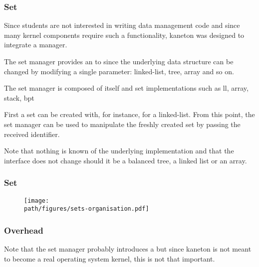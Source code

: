 \begin{frame}
  \frametitle{Set}

  Since students are not interested in writing data management code and
  since many kernel components require such a functionality, kaneton was
  designed to integrate a  manager.

  \-

  The set manager provides an  to
   since the underlying data structure can be changed by
  modifying a single parameter: linked-list, tree, array and so on.

  \-

  The set manager is composed of itself and set implementations such as ll,
  array, stack, bpt \etc{}

  \-

  First a set can be created with, for instance,
   for a linked-list. From
  this point, the set manager can be used to manipulate the freshly created
  set by passing the received identifier.

  \-

  Note that nothing is known of the underlying implementation and that
  the interface does not change should it be a balanced tree, a linked list
  or an array.
\end{frame}


\begin{frame}
  \frametitle{Set}

  \begin{figure}[h]
    \begin{center}
      \texttt{[image: \\path/figures/sets-organisation.pdf]}
    \end{center}
  \end{figure}
\end{frame}


\begin{frame}
  \frametitle{Overhead}

  Note that the set manager probably introduces a  but since kaneton is not meant to become a real operating
  system kernel, this is not that important.
\end{frame}



